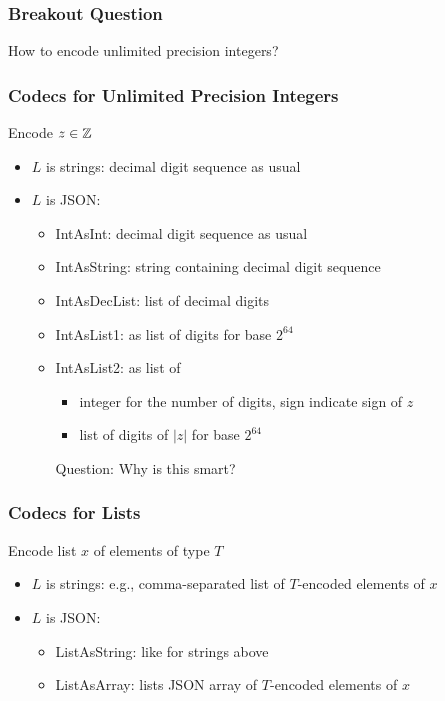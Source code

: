 \begin{frame}\frametitle{Breakout Question}
How to encode unlimited precision integers?
\end{frame}

\begin{frame}\frametitle{Codecs for Unlimited Precision Integers}
Encode $z\in\mathbb{Z}$
\begin{itemize}
\item $L$ is strings: decimal digit sequence as usual
\item $L$ is JSON:
 \begin{itemize}
 \item IntAsInt: decimal digit sequence as usual
 \item IntAsString: string containing decimal digit sequence
 \item IntAsDecList: list of decimal digits
 \item IntAsList1: as list of digits for base $2^{64}$
 \item IntAsList2: as list of
   \begin{itemize}
   \item integer for the number of digits, sign indicate sign of $z$
   \item list of digits of $|z|$ for base $2^{64}$
   \end{itemize}
   Question: Why is this smart?
   
 \end{itemize}
\end{itemize}
\end{frame}

\begin{frame}\frametitle{Codecs for Lists}
Encode list $x$ of elements of type $T$
\begin{itemize}
\item $L$ is strings: e.g., comma-separated list of $T$-encoded elements of $x$
\item $L$ is JSON:
 \begin{itemize}
 \item ListAsString: like for strings above
 \item ListAsArray: lists JSON array of $T$-encoded elements of $x$
 \end{itemize}
\end{itemize}
\end{frame}


